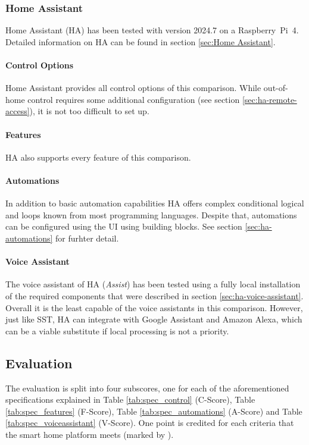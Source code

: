 \newpage
\subsubsection{Home Assistant}
Home Assistant (HA) has been tested with version 2024.7 on a Raspberry~Pi~4. Detailed information on HA can be found in section \ref{sec:Home Assistant}.

\paragraph{Control Options}
Home Assistant provides all control options of this comparison. While out-of-home control requires some additional configuration (see section \ref{sec:ha-remote-access}), it is not too difficult to set up.

\paragraph{Features}
HA also supports every feature of this comparison.

\paragraph{Automations}
In addition to basic automation capabilities HA offers complex conditional logical and loops known from most programming languages. Despite that, automations can be configured using the UI using building blocks. See section \ref{sec:ha-automations} for furhter detail. 

\paragraph{Voice Assistant}
The voice assistant of HA (\textit{Assist}) has been tested using a fully local installation of the required components that were described in section \ref{sec:ha-voice-assistant}. Overall it is the least capable of the voice assistants in this comparison. However, just like SST, HA can integrate with Google Assistant and Amazon Alexa, which can be a viable substitute if local processing is not a priority.

\newpage

\subsection{Evaluation}

The evaluation is split into four subscores, one for each of the aforementioned specifications explained in Table \ref{tab:spec_control} (C-Score), Table \ref{tab:spec_features} (F-Score), Table \ref{tab:spec_automations} (A-Score) and Table \ref{tab:spec_voiceassistant} (V-Score). One point is credited for each criteria that the smart home platform meets (marked by ).

